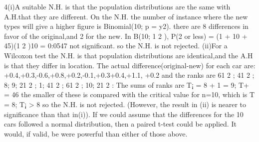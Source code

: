 4(i)A suitable N.H. is that the population distributions are the same with A.H.that
they are different. On the N.H. the number of instance where the new types will give a
higher figure is Binomial(10; p = y2).
there are 8 differences in favor of the original,and 2 for the new.
In B(10; 1
2 ), P(2 or less) = (1 + 10 + 45)(1
2 )10 = 0:0547 not significant. so the N.H. is
not rejected.
(ii)For a Wilcoxon test the N.H. is that population distributions are identical,and
the A.H is that they differ in location.
The actual difference(original-new) for each car are: +0.4,+0.3,-0.6,+0.8,+0.2,-0.1,+0.3+0.4,+1.1,
+0.2 and the ranks are 61
2 ; 41
2 ; 8; 9; 21
2 ; 1; 41
2 ; 61
2 ; 10; 21
2 : The sums of ranks are T¡ =
8 + 1 = 9; T+ = 46 the smaller of these is compared with the critical value for n=10,
which is T = 8; T¡ > 8 so the N.H. is not rejected.
(However, the result in (ii) is nearer to significance than that in(i)).
If we could assume that the differences for the 10 cars followed a normal distribution,
then a paired t-test could be applied. It would, if valid, be were powerful than either of
those above.

